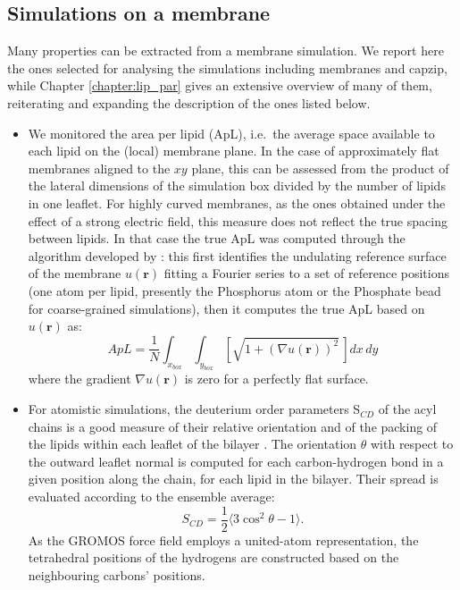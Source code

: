 \subsection{Simulations on a membrane}

Many properties can be extracted from a membrane simulation. We report here the ones selected for analysing the simulations including membranes and capzip, while Chapter \ref{chapter:lip_par} gives an extensive overview of many of them, reiterating and expanding the description of the ones listed below.

\begin{itemize}
\item We monitored the area per lipid (ApL), i.e.\ the average space available to each lipid on the (local) membrane plane. In the case of approximately flat membranes aligned to the $xy$ plane, this can be assessed from the product of the lateral dimensions of the simulation box divided by the number of lipids in one leaflet.
%
For highly curved membranes, as the ones obtained under the effect of a strong electric field, this measure does not reflect the true spacing between lipids. In that case the true ApL was computed through the algorithm developed by \citet{Braun2011}: this first identifies the undulating reference surface of the membrane $u(\textbf{r})$ fitting a Fourier series to a set of reference positions (one atom per lipid, presently the Phosphorus atom or the Phosphate bead for coarse-grained simulations), then it computes the true ApL based on $u(\textbf{r})$ as:
\begin{equation}
ApL = \frac{1}{N} \int_{x_{box}} \int_{y_{box}} \left[ \sqrt{1 + \left( \nabla u(\textbf{r}) \right)^2} \, \right] dx\,dy
\end{equation}
where the gradient $\nabla u(\textbf{r})$ is zero for a perfectly flat surface.

\item For atomistic simulations, the deuterium order parameters S$_{CD}$ of the acyl chains is a good measure of their relative orientation and of the packing of the lipids within each leaflet of the bilayer \citep{VanLehn2014a,Douliez1998,Piggot2017}. The orientation $\theta$ with respect to the outward leaflet normal is computed for each carbon-hydrogen bond in a given position along the chain, for each lipid in the bilayer. Their spread is evaluated according to the ensemble average:
\begin{equation}
S_{CD} = \frac{1}{2} \langle 3\cos^2 \theta - 1 \rangle.
\end{equation}
As the GROMOS force field employs a united-atom representation, the tetrahedral positions of the hydrogens are constructed based on the neighbouring carbons’ positions.


\end{itemize}
